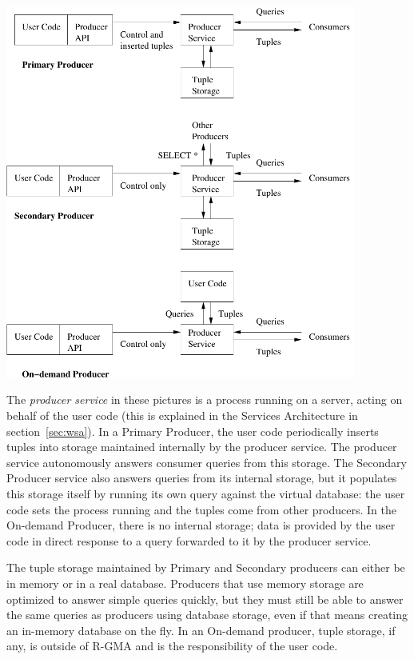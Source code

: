 \begin{center}
\includegraphics[width=115mm]{producers_overview}
\end{center}

The \textit{producer service} in these pictures is a process running
on a server, acting on behalf of the user code (this is explained in
the Services Architecture in section~\ref{sec:wsa}). In a Primary
Producer, the user code periodically inserts tuples into storage
maintained internally by the producer service. The producer service
autonomously answers consumer queries from this storage. The Secondary
Producer service also answers queries from its internal storage, but
it populates this storage itself by running its own query against the
virtual database: the user code sets the process running and the
tuples come from other producers. In the On-demand Producer, there is
no internal storage; data is provided by the user code in direct
response to a query forwarded to it by the producer service.

The tuple storage maintained by Primary and Secondary producers can
either be in memory or in a real database. Producers that use
memory storage are optimized to answer simple queries quickly,
but they must still be able to answer the same queries as producers using
database storage, even if that means creating an in-memory database on the fly.
In an On-demand producer, tuple storage, if any, is outside of R-GMA and is
the responsibility of the user code.

